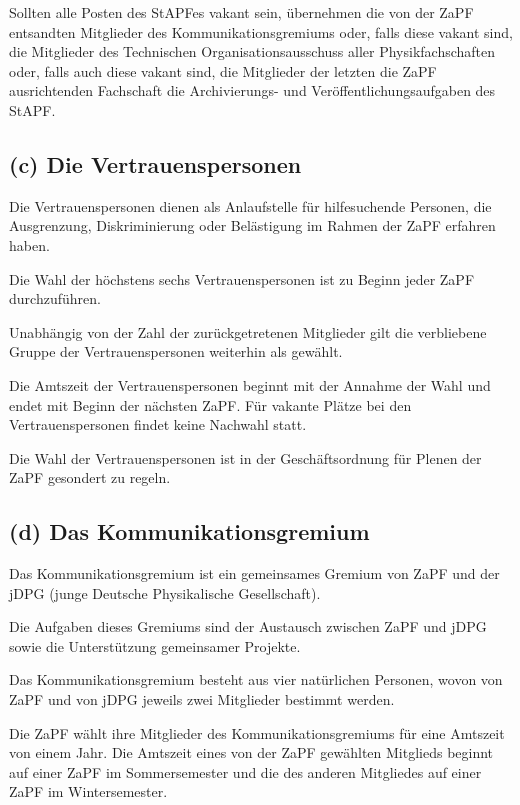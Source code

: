 \documentclass[12pt,oneside]{scrartcl}
\begin{document}
Sollten alle Posten des StAPFes vakant sein, übernehmen die von der ZaPF
entsandten Mitglieder des Kommunikationsgremiums oder, falls diese vakant sind,
die Mitglieder des Technischen Organisationsausschuss aller Physikfachschaften
oder, falls auch diese vakant sind, die Mitglieder der letzten die ZaPF
ausrichtenden Fachschaft die Archivierungs- und Veröffentlichungsaufgaben des
StAPF.


\subsection{(c) Die Vertrauenspersonen%
  \label{c-die-vertrauenspersonen}%
}

Die Vertrauenspersonen dienen als Anlaufstelle für hilfesuchende Personen, die
Ausgrenzung, Diskriminierung oder Belästigung im Rahmen der ZaPF erfahren haben.

Die Wahl der höchstens sechs Vertrauenspersonen ist zu Beginn jeder ZaPF durchzuführen.

Unabhängig von der Zahl der zurückgetretenen Mitglieder gilt die verbliebene
Gruppe der Vertrauenspersonen weiterhin als gewählt.

Die Amtszeit der Vertrauenspersonen beginnt mit der Annahme der Wahl und endet
mit Beginn der nächsten ZaPF. Für vakante Plätze bei den Vertrauenspersonen
findet keine Nachwahl statt.

Die Wahl der Vertrauenspersonen ist in der Geschäftsordnung für Plenen der ZaPF
gesondert zu regeln.


\subsection{(d) Das Kommunikationsgremium%
  \label{d-das-kommunikationsgremium}%
}

Das Kommunikationsgremium ist ein gemeinsames Gremium von ZaPF und der jDPG
(junge Deutsche Physikalische Gesellschaft).

Die Aufgaben dieses Gremiums sind der Austausch zwischen ZaPF und jDPG sowie die
Unterstützung gemeinsamer Projekte.

Das Kommunikationsgremium besteht aus vier natürlichen Personen, wovon von ZaPF
und von jDPG jeweils zwei Mitglieder bestimmt werden.

Die ZaPF wählt ihre Mitglieder des Kommunikationsgremiums für eine Amtszeit von
einem Jahr. Die Amtszeit eines von der ZaPF gewählten Mitglieds beginnt auf
einer ZaPF im Sommersemester und die des anderen Mitgliedes auf einer ZaPF im
Wintersemester.
\end{document}

